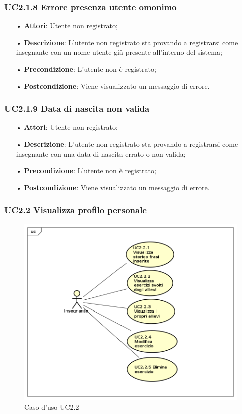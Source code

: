 \subsubsection{UC2.1.8 Errore presenza utente omonimo}
\begin{itemize}
	\item[•] \textbf{Attori}: Utente non registrato;
	\item[•] \textbf{Descrizione}:  L'utente non registrato sta provando a registrarsi come insegnante con un nome utente già presente all'interno del sistema;
	\item[•] \textbf{Precondizione}: L’utente non è registrato;
	\item[•] \textbf{Postcondizione}: Viene visualizzato un messaggio di errore.
\end{itemize}

\subsubsection{UC2.1.9 Data di nascita non valida}
\begin{itemize}
	\item[•] \textbf{Attori}: Utente non registrato;
	\item[•] \textbf{Descrizione}: L'utente non registrato sta provando a registrarsi come insegnante con una data di nascita errato o non valida;
	\item[•] \textbf{Precondizione}: L’utente non è registrato;
	\item[•] \textbf{Postcondizione}: Viene visualizzato un messaggio di errore.
\end{itemize}


\subsubsection{UC2.2 Visualizza profilo personale}

\begin{figure}[H]
\centering
\includegraphics[width=14cm]{img/UC22.png} 
\caption{Caso d'uso UC2.2}
\end{figure}

